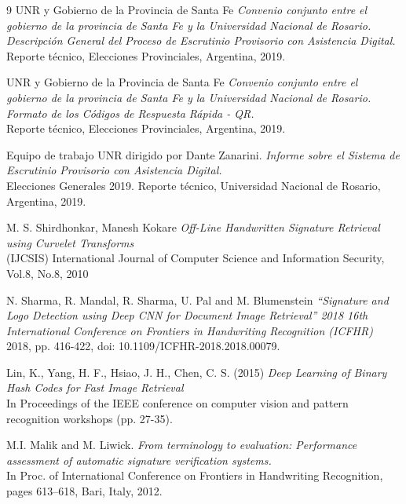 \begin{thebibliography}{9}
UNR y Gobierno de la Provincia de Santa Fe
\textit{ Convenio conjunto entre el gobierno de la provincia de Santa Fe y la Universidad Nacional de Rosario. Descripción General del Proceso de Escrutinio Provisorio con Asistencia Digital.   } \\
Reporte técnico, Elecciones Provinciales, Argentina, 2019.

UNR y Gobierno de la Provincia de Santa Fe
\textit{ Convenio conjunto entre el gobierno de la provincia de Santa Fe y la Universidad Nacional de Rosario. Formato de los Códigos de Respuesta Rápida - QR.  } \\
Reporte técnico, Elecciones Provinciales, Argentina, 2019.

Equipo de trabajo UNR dirigido por Dante Zanarini.
\textit{ Informe sobre el Sistema de Escrutinio Provisorio con Asistencia Digital. } \\
Elecciones Generales 2019. Reporte técnico, Universidad Nacional de Rosario, Argentina, 2019.

M. S. Shirdhonkar, Manesh Kokare
\textit{ Off-Line Handwritten Signature Retrieval using Curvelet Transforms } \\
(IJCSIS) International Journal of Computer Science and Information Security, Vol.8, No.8, 2010

N. Sharma, R. Mandal, R. Sharma, U. Pal and M. Blumenstein
\textit{ ``Signature and Logo Detection using Deep CNN for Document Image Retrieval'' 2018 16th International Conference on Frontiers in Handwriting Recognition (ICFHR) } \\
2018, pp. 416-422, doi: 10.1109/ICFHR-2018.2018.00079.

Lin, K., Yang, H. F., Hsiao, J. H.,  Chen, C. S. (2015)
\textit{ Deep Learning of Binary Hash Codes for Fast Image Retrieval } \\
In Proceedings of the IEEE conference on computer vision and pattern recognition workshops (pp. 27-35).

M.I. Malik and M. Liwick.
\textit{ From terminology to evaluation: Performance assessment of automatic signature verification systems. } \\
In Proc. of International Conference on Frontiers in Handwriting Recognition, pages 613–618, Bari, Italy, 2012.


\end{thebibliography}
